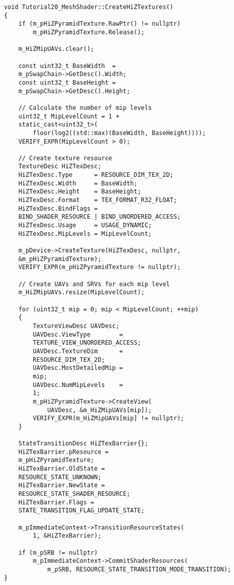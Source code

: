 \begin{lstlisting}
void Tutorial20_MeshShader::CreateHiZTextures()
{
    if (m_pHiZPyramidTexture.RawPtr() != nullptr)
        m_pHiZPyramidTexture.Release();

    m_HiZMipUAVs.clear();

    const uint32_t BaseWidth  = 
    m_pSwapChain->GetDesc().Width;
    const uint32_t BaseHeight = 
    m_pSwapChain->GetDesc().Height;

    // Calculate the number of mip levels
    uint32_t MipLevelCount = 1 + 
    static_cast<uint32_t>(
        floor(log2((std::max)(BaseWidth, BaseHeight))));
    VERIFY_EXPR(MipLevelCount > 0);

    // Create texture resource
    TextureDesc HiZTexDesc;
    HiZTexDesc.Type      = RESOURCE_DIM_TEX_2D;
    HiZTexDesc.Width     = BaseWidth;
    HiZTexDesc.Height    = BaseHeight;
    HiZTexDesc.Format    = TEX_FORMAT_R32_FLOAT;
    HiZTexDesc.BindFlags = 
    BIND_SHADER_RESOURCE | BIND_UNORDERED_ACCESS;
    HiZTexDesc.Usage     = USAGE_DYNAMIC;
    HiZTexDesc.MipLevels = MipLevelCount;

    m_pDevice->CreateTexture(HiZTexDesc, nullptr, 
    &m_pHiZPyramidTexture);
    VERIFY_EXPR(m_pHiZPyramidTexture != nullptr);

    // Create UAVs and SRVs for each mip level
    m_HiZMipUAVs.resize(MipLevelCount);

    for (uint32_t mip = 0; mip < MipLevelCount; ++mip)
    {
        TextureViewDesc UAVDesc;
        UAVDesc.ViewType        = 
        TEXTURE_VIEW_UNORDERED_ACCESS;
        UAVDesc.TextureDim      = 
        RESOURCE_DIM_TEX_2D;
        UAVDesc.MostDetailedMip = 
        mip;
        UAVDesc.NumMipLevels    = 
        1;
        m_pHiZPyramidTexture->CreateView(
            UAVDesc, &m_HiZMipUAVs[mip]);
        VERIFY_EXPR(m_HiZMipUAVs[mip] != nullptr);
    }
    
    StateTransitionDesc HiZTexBarrier{};
    HiZTexBarrier.pResource = 
    m_pHiZPyramidTexture;
    HiZTexBarrier.OldState = 
    RESOURCE_STATE_UNKNOWN;
    HiZTexBarrier.NewState = 
    RESOURCE_STATE_SHADER_RESOURCE;
    HiZTexBarrier.Flags = 
    STATE_TRANSITION_FLAG_UPDATE_STATE;
    
    m_pImmediateContext->TransitionResourceStates(
        1, &HiZTexBarrier);

    if (m_pSRB != nullptr)
        m_pImmediateContext->CommitShaderResources(
            m_pSRB, RESOURCE_STATE_TRANSITION_MODE_TRANSITION);
}
\end{lstlisting}

